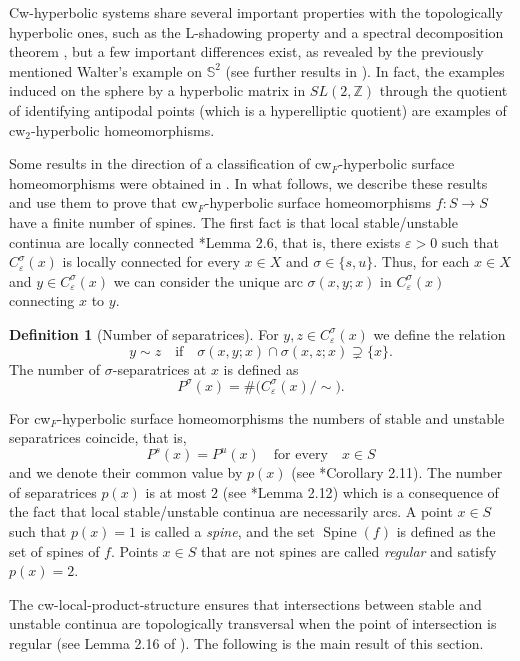 \documentclass{amsart}
\theoremstyle{plain}
\theoremstyle{definition}
\newtheorem{definition}[theorem]{Definition}
\newcommand{\spine}{\operatorname{Spine}}
\newcommand{\Z}{\mathbb{Z}}
\newcommand{\eps}{\varepsilon}
\begin{document}
Cw-hyperbolic systems share several important properties with the topologically hyperbolic ones, such as the L-shadowing property \cite{ACCV} and a spectral decomposition theorem \cite{A,ACCV3,S}, but a few important differences exist, %
as revealed by the previously mentioned
Walter's example on $\mathbb{S}^2$ (see further results in \cite{CR,COR}). In fact, the examples induced on the sphere by a hyperbolic matrix in $SL(2,\Z)$ through the quotient of identifying antipodal points (which is a hyperelliptic quotient) are examples of cw$_2$-hyperbolic homeomorphisms.

Some results in the direction of a classification of cw$_F$-hyperbolic surface homeomorphisms were obtained in \cite{ACS}. In what follows, we describe these results and use them to prove that cw$_F$-hyperbolic surface homeomorphisms $f\colon S\to S$ have a finite number of spines. The first fact is that local stable/unstable continua are locally connected \cite{ACS}*{Lemma 2.6}, that is, there exists $\eps>0$ such that $C^{\sigma}_{\eps}(x)$ is locally connected for every $x\in X$ and $\sigma\in\{s,u\}$. Thus, for each $x\in X$ and $y\in C^{\sigma}_{\eps}(x)$ we can consider the unique arc $\sigma(x,y;x)$ in $C^\sigma_\varepsilon(x)$ connecting $x$ to $y$.

\begin{definition}[Number of separatrices]
For $y,z\in C^\sigma_\varepsilon(x)$ we define
the relation
\[
y\sim z
\quad\text{if}\quad
\sigma(x,y;x)\cap\sigma(x,z;x)\supsetneq\{x\}.
\]
The number of $\sigma$-separatrices at $x$ is defined as
$$P^\sigma(x)=\#\big(C^\sigma_\varepsilon(x)/\sim\big).$$
\end{definition}
For cw$_F$-hyperbolic surface homeomorphisms the numbers of stable and unstable separatrices coincide, that is,
$$P^s(x)=P^u(x) \,\,\,\,\,\, \text{for every} \,\,\,\,\,\, x\in S$$
and we denote their common value by $p(x)$ (see \cite{ACS}*{Corollary 2.11}). The number of separatrices $p(x)$ is at most $2$ (see \cite{ACS}*{Lemma 2.12}) which is a consequence of the fact that local stable/unstable continua are necessarily arcs. A point $x\in S$ such that $p(x)=1$ is called a \emph{spine}, and the set $\spine(f)$ is defined as the set of spines of $f$. Points $x\in S$ that are not spines are called \emph{regular} and satisfy $p(x)=2$. 

The cw-local-product-structure ensures that intersections between stable and unstable continua are topologically transversal when the point of intersection is regular (see Lemma 2.16 of \cite{ACS}). 
The following is the main result of this section.
\end{document}
